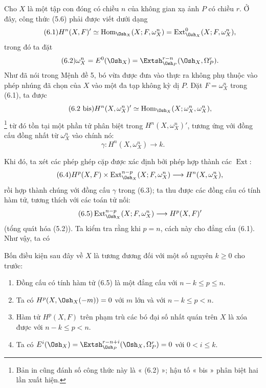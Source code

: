 
Cho $X$ là một tập con đóng có chiều $n$ của không gian xạ ảnh $P$ có
chiều $r$. Ở đây, công thức (5.6) phải được viết dưới dạng
\begin{equation}\tag{6.1}
  H^{n}(X,F)'
  \simeq\operatorname{Hom}_{\Osh_X}(X;F,\omega_X^{n})
  =\operatorname{Ext}_{\Osh_X}^{0}(X;F,\omega_X^{n}),
\end{equation}
trong đó ta đặt
\begin{equation}\tag{6.2}
  \omega_X^{n}=E^{0}(\Osh_X)
  =\Extsh_{\Osh_P}^{r-n}(\Osh_X,\Omega_P^{r}).
\end{equation}
Như đã nói trong Mệnh đề 5, bó vừa được đưa vào thực ra không phụ thuộc
vào phép nhúng đã chọn của $X$ vào một đa tạp không kỳ dị $P$.
Đặt $F=\omega_X^{n}$ trong (6.1), ta được
\begin{equation}\tag{6.2 bis}
  H^{n}(X,\omega_X^{n})'
  \simeq\operatorname{Hom}_{\Osh_X}(X;\omega_X^{n},\omega_X^{n}),
\end{equation}
\footnote{Bản in cũng đánh số công thức này là « (6.2) »; hậu tố
« bis » phân biệt hai lần xuất hiện.} từ đó tồn tại một phần tử
phân biệt trong $H^{n}(X,\omega_X^{n})'$, tương ứng với đồng cấu
đồng nhất từ $\omega_X^{n}$ vào chính nó:
\begin{equation}\tag{6.3}
  \gamma:H^{n}(X,\omega_X^{n})\longrightarrow k.
\end{equation}

Khi đó, ta xét các phép ghép cặp được xác định bởi phép hợp thành các
$\operatorname{Ext}$:
\begin{equation}\tag{6.4}
  H^{p}(X,F)\times
  \operatorname{Ext}_{\Osh_X}^{n-p}(X;F,\omega_X^{n})
  \longrightarrow H^{n}(X,\omega_X^{n}),
\end{equation}
rồi hợp thành chúng với đồng cấu $\gamma$ trong (6.3); ta thu được
các đồng cấu có tính hàm tử, tương thích với các toán tử nối:
\begin{equation}\tag{6.5}
  \operatorname{Ext}_{\Osh_X}^{n-p}(X;F,\omega_X^{n})
  \longrightarrow H^{p}(X,F)'
\end{equation}
(tổng quát hóa (5.2)). Ta kiểm tra rằng khi $p=n$, cách này cho
đẳng cấu (6.1). Như vậy, ta có

 Bốn điều kiện sau đây về $X$ là tương đương đối với
một số nguyên $k\geq0$ cho trước:
\begin{enumerate}
  \item[\textit{i.}] Đồng cấu có tính hàm tử (6.5) là một đẳng cấu với
    $n-k\leq p\leq n$.
  \item[\textit{ii.}] Ta có $H^{p}(X,\Osh_X(-m))=0$ với $m$ lớn và với
    $n-k\leq p<n$.
  \item[\textit{iii.}] Hàm tử $H^{p}(X,F)$ trên phạm trù các bó đại số
    nhất quán trên $X$ là xóa được với $n-k\leq p<n$.
  \item[\textit{iv.}] Ta có
    $E^{i}(\Osh_X)=\Extsh_{\Osh_P}^{r-n+i}(\Osh_X,\Omega_P^{r})=0$
    với $0<i\leq k$.
\end{enumerate}


